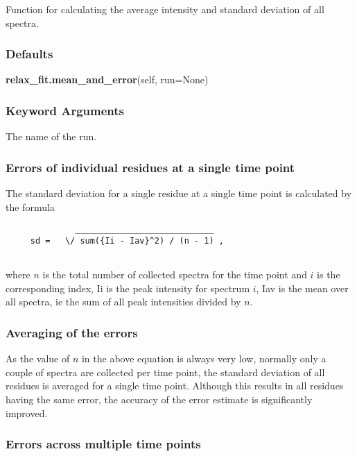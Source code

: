  Function for calculating the average intensity and standard deviation of all spectra. 
  

  
 \subsubsection{Defaults} 

 \textsf{\textbf{relax\_fit.mean\_and\_error}(self, run=None)} 

  
 \subsubsection{Keyword Arguments} 

   The name of the run.  

  

  
 \subsubsection{Errors of individual residues at a single time point} 

 The standard deviation for a single residue at a single time point is calculated by the formula 
  

 {\footnotesize \begin{verbatim} 
              ____________________________ 
     sd =   \/ sum({Ii - Iav}^2) / (n - 1) , 
  
 \end{verbatim}} 

 where $n$ is the total number of collected spectra for the time point and $i$ is the corresponding index, Ii is the peak intensity for spectrum $i$, Iav is the mean over all spectra, ie the sum of all peak intensities divided by $n$. 
  

  
 \subsubsection{Averaging of the errors} 

 As the value of $n$ in the above equation is always very low, normally only a couple of spectra are collected per time point, the standard deviation of all residues is averaged for a single time point.  Although this results in all residues having the same error, the accuracy of the error estimate is significantly improved. 
  

  
 \subsubsection{Errors across multiple time points} 

